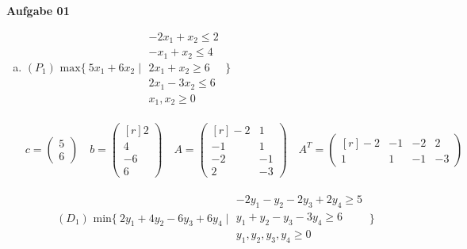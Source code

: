 \documentclass[a4paper,10pt]{article}
\begin{document}
	\parindent0pt
	\textbf{Aufgabe 01}\\
	\begin{enumerate}[a)]
	\item 
	$(P_1) \text{ max} \{\ 5x_1 + 6x_2 \mid 
	\begin{matrix}
		-2x_1 + x_2 \leq 2\\
		-x_1 + x_2 \leq 4\\
		2x_1 + x_2 \geq 6\\
		2x_1 - 3x_2 \leq 6\\
		x_1, x_2 \geq 0
	\end{matrix}
	\ \}$
	\\\\
	\[
	c = 
	\begin{pmatrix}
		5\\
		6
	\end{pmatrix}
	\quad
	b = 
	\begin{pmatrix*}[r]
		2\\
		4\\
		-6\\
		6
	\end{pmatrix*}
	\quad
	A =
	\begin{pmatrix*}[r]
		-2 & 1\\
		-1 & 1\\
		-2 & -1\\
		2 & -3
	\end{pmatrix*}
	\quad
	A^T = 
	\begin{pmatrix*}[r]
		-2 & -1 & -2 & 2\\
		1 & 1 & -1 & -3
	\end{pmatrix*}
	\]
	\ \\
	\[
	(D_1) \text{ min} \{\ 2y_1 + 4y_2 -6y_3 +6y_4 \mid 
	\begin{matrix}
		-2y_1 - y_2 -2y_3 + 2y_4 \geq 5\\
		y_1 + y_2 -y_3 -3y_4 \geq 6\\
		y_1, y_2, y_3, y_4 \geq 0
	\end{matrix}
	\ \}
	\]


\end{enumerate}
\end{document}
